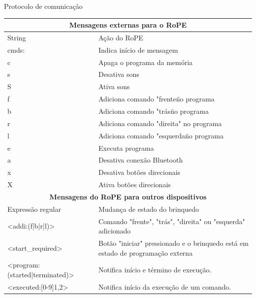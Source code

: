 {\renewcommand{\arraystretch}{1.3}
\begin{quadro}
    \caption{Protocolo de comunicação}
    \label{quadro:protocol}
    \begin{centering}
    \begin{tabular}{|p{}|p{}|}
        \hline
        \multicolumn{2}{|c|}{\textbf{Mensagens externas para o RoPE}} \\ \hline
        String           & Ação do RoPE                                \\ \hline
        cmds:            & Indica início de mensagem \\ \hline
        c                & Apaga o programa da memória \\ \hline
        s                & Desativa sons \\ \hline
        S                & Ativa sons \\ \hline
        f                & Adiciona comando "frente\" no programa \\ \hline
        b                & Adiciona comando "trás\" no programa \\ \hline
        r                & Adiciona comando "direita" no programa \\ \hline
        l                & Adiciona comando "esquerda\" no programa \\ \hline
        e                & Executa programa \\ \hline
        a                & Desativa conexão Bluetooth \\ \hline
        x                & Desativa botões direcionais \\ \hline
        X                & Ativa botões direcionais \\ \hline
        \multicolumn{2}{|c|}{\textbf{Mensagens do RoPE para outros dispositivos}} \\ \hline
        Expressão regular & Mudança de estado do brinquedo \\ \hline
        <addi:(f|b|r|l)>  & Comando "frente", "trás", "direita" ou "esquerda" adicionado \\ \hline
        <start\_required>  & Botão "iniciar" pressionado e o brinquedo está em estado de programação externa \\ \hline
        <program:(started|terminated)>  & Notifica início e término de execução. \\ \hline
        <executed:[0-9]{1,2}>  & Notifica início da execução de um comando. \\ \hline
    \end{tabular}
    \end{centering}
    \sourceauthor
\end{quadro}
}

